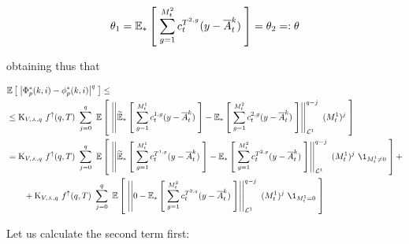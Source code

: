 	\begin{equation}
		\theta_1 = \mathbb{E}_{\ast} \left[ \; 
			\sum _{g = 1}^{M_t^2}
			c_t^{T^{2,g}}
			(y - \overline{A}_t^k)
		 \; \right] = \theta_2 =: \theta
	\end{equation}
	
	obtaining thus that
	
	\begin{align*}
		&\E{
			\norm{
				\Phi_p^\ast(k,i) - \phi_p^\ast(k,i)
			}^q
		}\leq
		\\
		&\leq
		\const_{\attraction,\curlywedge,q}\
		\Fup(q,T)\
		\sum_{j=0}^{q}\
		\E{
			\Norm{
				\ETFoot{\ast}{
					\sum _{g = 1}^{\hmactive_t^1}
					\cdens_t^{1,g}
					(y - \mfamba_t^k)
				}
				-
				\EFoot
				{\ast}{
					\sum _{g = 1}^{\hmactive_t^2}
					\cdens_t^{2,g}
					(y - \mfamba_t^k)
				}
			}_{\Lpspace^1}^{q-j}\
			(\hmactive_t^1)^j 
		}  
		\\
		&=
		\const_{\attraction,\curlywedge,q}\
		\Fup(q,T)\
		\sum_{j=0}^{q}\
		\E{
			\Norm{
				\ETFoot{\ast}{
					\sum _{g = 1}^{\hmactive_t^1}
					\cdens_t^{\btime^{1,g}}
					(y - \mfamba_t^k)
				}
				-
				\EFoot
				{\ast}{
					\sum _{g = 1}^{\hmactive_t^2}
					\cdens_t^{\btime^{2,g}}
					(y - \mfamba_t^k)
				}
			}_{\Lpspace^1}^{q-j}\
			(\hmactive_t^1)^j\
			\1_{\hmactive_t^1 \neq 0}			
		} +
		\\
		&\qquad
		+ 
		\const_{\attraction,\curlywedge,q}\
		\Fup(q,T)\
		\sum_{j=0}^{q}\
		\E{
			\Norm{
				0
				-
				\EFoot
				{\ast}{
					\sum _{g = 1}^{\hmactive_t^2}
					\cdens_t^{\btime^{2,g}}
					(y - \mfamba_t^k)
				}
			}_{\Lpspace^1}^{q-j}\
			(\hmactive_t^1)^j\
			\1_{\hmactive_t^1 = 0}			
		}
	\end{align*}
	
	Let us calculate the second term first:
	
